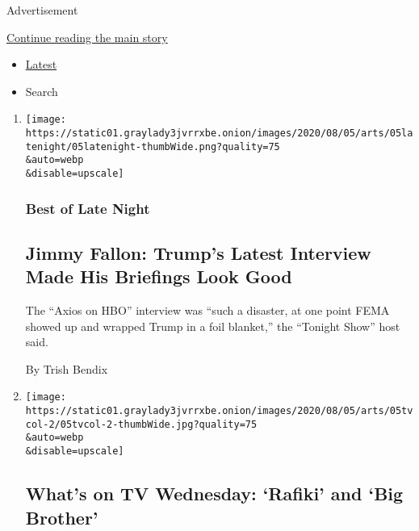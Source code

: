 Advertisement

\protect\hyperlink{after-mid1}{Continue reading the main story}

\begin{itemize}
\tightlist
\item
  \protect\hyperlink{stream-panel}{Latest}
\item
  Search
\end{itemize}

\begin{enumerate}
\def\labelenumi{\arabic{enumi}.}
\item
  \href{/2020/08/05/arts/television/jimmy-fallon-trumps-latest-interview-made-his-briefings-look-good.html}{}

  \texttt{[image: https://static01.graylady3jvrrxbe.onion/images/2020/08/05/arts/05latenight/05latenight-thumbWide.png?quality=75\\\&auto=webp\\\&disable=upscale]}

  \hypertarget{best-of-late-night}{%
  \subsubsection{Best of Late Night}\label{best-of-late-night}}

  \hypertarget{jimmy-fallon-trumps-latest-interview-made-his-briefings-look-good}{%
  \subsection{Jimmy Fallon: Trump's Latest Interview Made His Briefings
  Look
  Good}\label{jimmy-fallon-trumps-latest-interview-made-his-briefings-look-good}}

  The ``Axios on HBO'' interview was ``such a disaster, at one point
  FEMA showed up and wrapped Trump in a foil blanket,'' the ``Tonight
  Show'' host said.

  By Trish Bendix
\item
  \href{/2020/08/05/arts/television/whats-on-tv-wednesday-rafiki-and-big-brother.html}{}

  \texttt{[image: https://static01.graylady3jvrrxbe.onion/images/2020/08/05/arts/05tvcol-2/05tvcol-2-thumbWide.jpg?quality=75\\\&auto=webp\\\&disable=upscale]}

  \hypertarget{whats-on-tv-wednesday-rafiki-and-big-brother}{%
  \subsection{What's on TV Wednesday: `Rafiki' and `Big
  Brother'}\label{whats-on-tv-wednesday-rafiki-and-big-brother}}


\end{enumerate}
